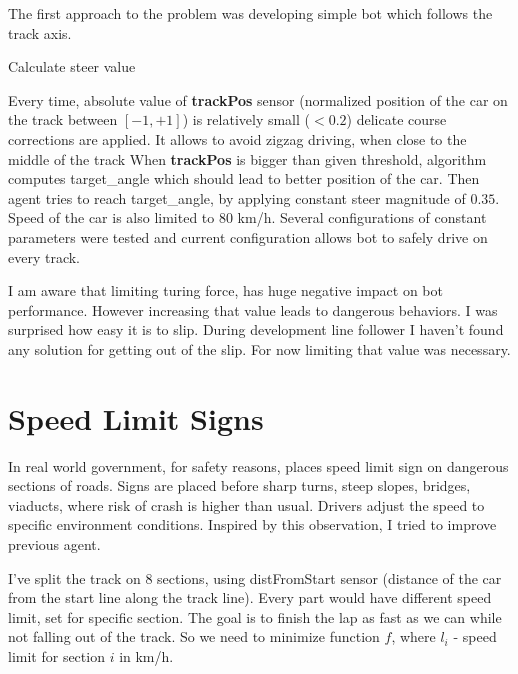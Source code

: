 \documentclass[declaration,shortabstract,english,inz]{iithesis}
\begin{document}
The first approach to the problem was developing simple bot which follows the track axis.


\begin{algorithm}
    \caption{Calculate steer value}
    \label{alg:steer}
    \begin{algorithmic}
        \ELSE 
        \ENDIF
    \end{algorithmic}
\end{algorithm}

Every time, absolute value of \textbf{trackPos} sensor (normalized position of the car on the track between $ [-1, +1] $) is relatively small ($ < 0.2 $) delicate course corrections are applied. It allows to avoid zigzag driving, when close to the middle of the track
When \textbf{trackPos} is bigger than given threshold, algorithm computes target\_angle which should lead to better position of the car.
Then agent tries to reach target\_angle, by applying constant steer magnitude of $0.35$.
Speed of the car is also limited to 80 km/h.
Several configurations of constant parameters were tested and current configuration allows bot to safely drive on every track.


I am aware that limiting turing force, has huge negative impact on bot performance.
However increasing that value leads to dangerous behaviors.
I was surprised how easy it is to slip.
During development line follower I haven't found any solution for getting out of the slip.
For now limiting that value was necessary.

\section{Speed Limit Signs}

In real world government, for safety reasons, places speed limit sign on dangerous sections of roads.
Signs are placed before sharp turns, steep slopes, bridges, viaducts, where risk of crash is higher than usual.
Drivers adjust the speed to specific environment conditions.
Inspired by this observation, I tried to improve previous agent.


I've split the track on 8 sections, using distFromStart sensor (distance of the car from the start line along the track line).
Every part would have different speed limit, set for specific section.
The goal is to finish the lap as fast as we can while not falling out of the track.
So we need to minimize function $f$, where $l_i$ - speed limit for section $i$ in km/h.
\end{document}
